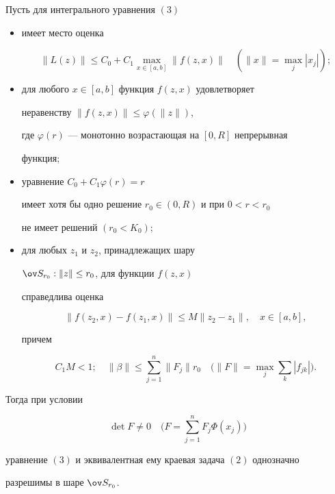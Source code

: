 \begin{thm} 


Пусть для интегрального уравнения $(3)$ 


\begin{itemize} 


\item[1.] имеет место оценка 


$$ 


\|L(z)\|\le C_0+C_1\max_{x\in[a,b]}\|f(z,x)\|\quad 


(\|x\|=\max_j |x_j|); 


$$ 


\item[2.] для любого $x\in[a,b]$ функция $f(z,x)$ удовлетворяет 


неравенству $\|f(z,x)\|\le\varphi(\|z\|)$, 


где $\varphi(r)$ --- монотонно возрастающая на $[0,R]$ непрерывная 


функция$;$ 


\item[3.] уравнение $C_0+C_1\varphi(r)=r$ 


имеет хотя бы одно решение $r_0\in(0,R)$ и при $0<r<r_0$ 


не имеет решений $(r_0<K_0);$ 


\item[4.] для любых $z_1$ и $z_2$, принадлежащих шару 


$\ov S_{r_0}:\|z\|\le r_0$, для функции $f(z,x)$ 


справедлива оценка 


$$ 


\|f(z_2,x)-f(z_1,x)\|\le M\|z_2-z_1\|,\quad x\in[a,b], 


$$ 


причем 


$$ 


C_1M<1;\quad \|\beta\|\le\sum^n_{j=1}\|F_j\|r_0\quad 


\Big(\|F\|=\max_j\sum_k|f_{jk}|\Big). 


$$ 


\end{itemize} 


Тогда при условии 


$$ 


\det F\ne 0 \quad \Big(F=\sum^n_{j=1}F_j\Phi(x_j)\Big) 


$$ 


уравнение $(3)$ и эквивалентная ему краевая задача $(2)$ однозначно 


разрешимы в шаре $\ov S_{r_0}$. 


\end{thm} 


